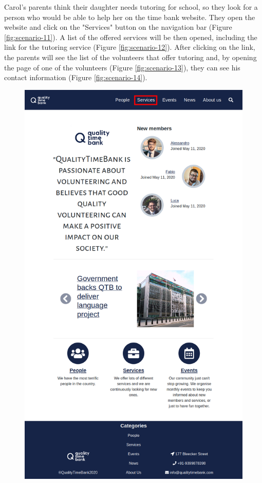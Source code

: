 \documentclass[a4paper, 11pt, parskip=half, headsepline]{scrreprt}
\begin{document}
Carol's parents think their daughter needs tutoring for school, so they look for a person who would be able to help her on the time bank website. They open the website and click on the "Services" button on the navigation bar (Figure \ref{fig:scenario-11}). A list of the offered services will be then opened, including the link for the tutoring service (Figure \ref{fig:scenario-12}). After clicking on the link, the parents will see the list of the volunteers that offer tutoring and, by opening the page of one of the volunteers (Figure \ref{fig:scenario-13}), they can see his contact information (Figure \ref{fig:scenario-14}).

\begin{figure}[H]
    \begin{minipage}[t]{0.5\textwidth}
        \centering
    	\includegraphics[width=1\linewidth, keepaspectratio]{scenarios/scenario-11}

\end{minipage}
\end{figure}
\end{document}
